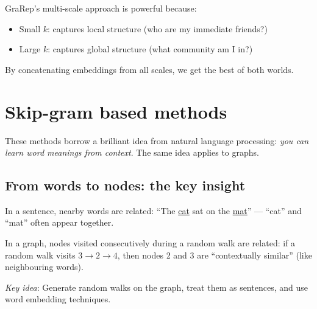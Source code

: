\begin{notechapter}
\begin{keyidea}
GraRep's multi-scale approach is powerful because:
\begin{itemize}
    \item Small $k$: captures local structure (who are my immediate friends?)
    \item Large $k$: captures global structure (what community am I in?)
\end{itemize}
By concatenating embeddings from all scales, we get the best of both worlds.
\end{keyidea}


\section{Skip-gram based methods}

These methods borrow a brilliant idea from natural language processing: \emph{you can learn word meanings from context}. The same idea applies to graphs.

\subsection{From words to nodes: the key insight}

\begin{intuition}
In a sentence, nearby words are related: ``The \underline{cat} sat on the \underline{mat}'' --- ``cat'' and ``mat'' often appear together.

In a graph, nodes visited consecutively during a random walk are related: if a random walk visits $3 \to 2 \to 4$, then nodes 2 and 3 are ``contextually similar'' (like neighbouring words).

\emph{Key idea}: Generate random walks on the graph, treat them as sentences, and use word embedding techniques.
\end{intuition}

\begin{figure}[htbp]
\centering
{}
\end{figure}
\end{notechapter}
